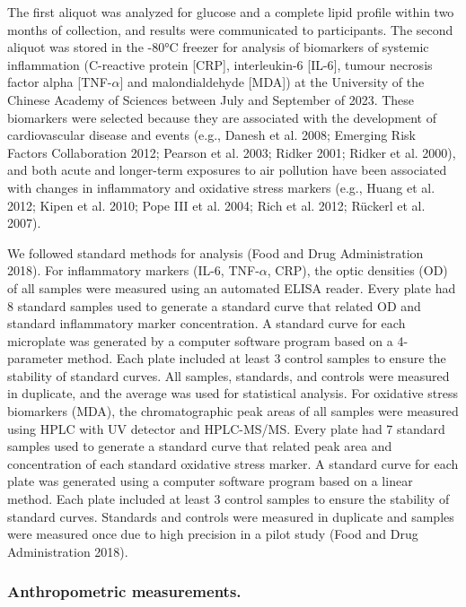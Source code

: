 \documentclass[
  letterpaper,
  DIV=11,
  numbers=noendperiod]{scrartcl}
\begin{document}
The first aliquot was analyzed for glucose and a complete lipid profile
within two months of collection, and results were communicated to
participants. The second aliquot was stored in the -80°C freezer for
analysis of biomarkers of systemic inflammation (C-reactive protein
{[}CRP{]}, interleukin-6 {[}IL-6{]}, tumour necrosis factor alpha
{[}TNF-\(\alpha\){]} and malondialdehyde {[}MDA{]}) at the University of
the Chinese Academy of Sciences between July and September of 2023.
These biomarkers were selected because they are associated with the
development of cardiovascular disease and events (e.g., Danesh et al.
2008; Emerging Risk Factors Collaboration 2012; Pearson et al. 2003;
Ridker 2001; Ridker et al. 2000), and both acute and longer-term
exposures to air pollution have been associated with changes in
inflammatory and oxidative stress markers (e.g., Huang et al. 2012;
Kipen et al. 2010; Pope III et al. 2004; Rich et al. 2012; Rückerl et
al. 2007).

We followed standard methods for analysis (Food and Drug Administration
2018). For inflammatory markers (IL-6, TNF-\(\alpha\), CRP), the optic
densities (OD) of all samples were measured using an automated ELISA
reader. Every plate had 8 standard samples used to generate a standard
curve that related OD and standard inflammatory marker concentration. A
standard curve for each microplate was generated by a computer software
program based on a 4-parameter method. Each plate included at least 3
control samples to ensure the stability of standard curves. All samples,
standards, and controls were measured in duplicate, and the average was
used for statistical analysis. For oxidative stress biomarkers (MDA),
the chromatographic peak areas of all samples were measured using HPLC
with UV detector and HPLC-MS/MS. Every plate had 7 standard samples used
to generate a standard curve that related peak area and concentration of
each standard oxidative stress marker. A standard curve for each plate
was generated using a computer software program based on a linear
method. Each plate included at least 3 control samples to ensure the
stability of standard curves. Standards and controls were measured in
duplicate and samples were measured once due to high precision in a
pilot study (Food and Drug Administration 2018).

\hypertarget{anthropometric-measurements.}{%
\subsubsection{Anthropometric
measurements.}\label{anthropometric-measurements.}}
\end{document}
